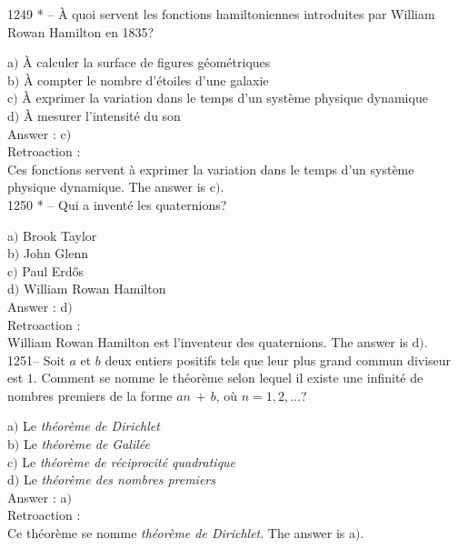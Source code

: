 ﻿\documentclass[letterpaper, 12pt]{article}
\begin{document}
1249 * -- \`A quoi servent les fonctions hamiltoniennes introduites
par William Rowan Hamilton en 1835?

a$)$ \`A calculer la surface de figures g\'eom\'etriques \\
b$)$ \`A compter le nombre d'\'etoiles d'une galaxie \\
c$)$ \`A exprimer la variation dans le temps d'un syst\`eme physique
dynamique \\
d$)$ \`A mesurer l'intensit\'e du son \\

Answer : c$)$\\

Retroaction : \\
Ces fonctions servent \`a exprimer la variation dans le temps d'un
syst\`eme physique dynamique.
The answer is c$)$.\\

1250 * -- Qui a invent\'e les quaternions?

a$)$ Brook Taylor \\
b$)$ John Glenn \\
c$)$ Paul Erd\H{o}s \\
d$)$ William Rowan Hamilton\\

Answer : d$)$\\

Retroaction : \\
William Rowan Hamilton est l'inventeur des quaternions.
The answer is d$)$.\\

1251-- Soit $a$ et $b$ deux entiers positifs tels que leur plus
grand commun diviseur est $1$. Comment se nomme le th\'eor\`eme
selon lequel il existe une infinit\'e de nombres premiers de la
forme $an\,+\,b$, o\`u $n=1,2,\ldots$?

a$)$ Le {\sl th\'eor\`eme de Dirichlet} \\
b$)$ Le {\sl th\'eor\`eme de Galil\'ee} \\
c$)$ Le {\sl th\'eor\`eme de r\'eciprocit\'e quadratique} \\
d$)$ Le {\sl th\'eor\`eme des nombres premiers}\\

Answer : a$)$\\

Retroaction : \\
Ce th\'eor\`eme se nomme {\sl th\'eor\`eme de Dirichlet}.
The answer is a$)$.\\
\end{document}

